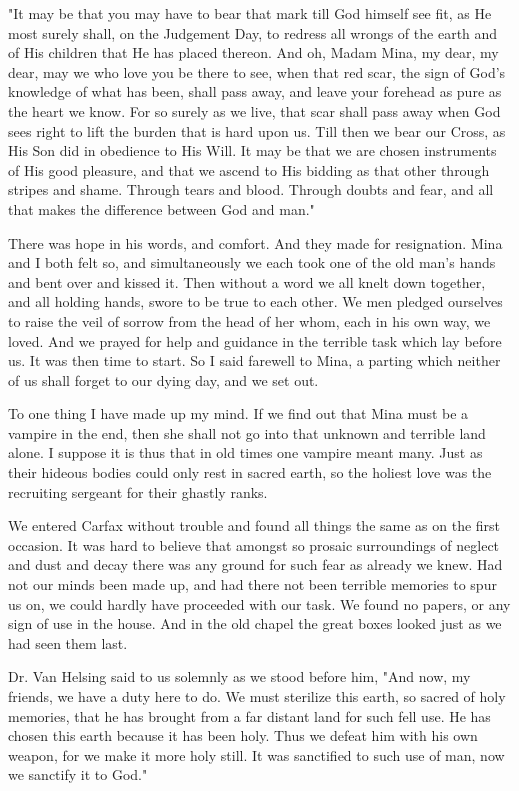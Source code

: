 "It may be that you may have to bear that mark till God himself see fit, as He most surely shall, on the Judgement Day, to redress all wrongs of the earth and of His children that He has placed thereon. And oh, Madam Mina, my dear, my dear, may we who love you be there to see, when that red scar, the sign of God's knowledge of what has been, shall pass away, and leave your forehead as pure as the heart we know. For so surely as we live, that scar shall pass away when God sees right to lift the burden that is hard upon us. Till then we bear our Cross, as His Son did in obedience to His Will. It may be that we are chosen instruments of His good pleasure, and that we ascend to His bidding as that other through stripes and shame. Through tears and blood. Through doubts and fear, and all that makes the difference between God and man." 

There was hope in his words, and comfort. And they made for resignation. Mina and I both felt so, and simultaneously we each took one of the old man's hands and bent over and kissed it. Then without a word we all knelt down together, and all holding hands, swore to be true to each other. We men pledged ourselves to raise the veil of sorrow from the head of her whom, each in his own way, we loved. And we prayed for help and guidance in the terrible task which lay before us. It was then time to start. So I said farewell to Mina, a parting which neither of us shall forget to our dying day, and we set out. 

To one thing I have made up my mind. If we find out that Mina must be a vampire in the end, then she shall not go into that unknown and terrible land alone. I suppose it is thus that in old times one vampire meant many. Just as their hideous bodies could only rest in sacred earth, so the holiest love was the recruiting sergeant for their ghastly ranks. 

We entered Carfax without trouble and found all things the same as on the first occasion. It was hard to believe that amongst so prosaic surroundings of neglect and dust and decay there was any ground for such fear as already we knew. Had not our minds been made up, and had there not been terrible memories to spur us on, we could hardly have proceeded with our task. We found no papers, or any sign of use in the house. And in the old chapel the great boxes looked just as we had seen them last. 

Dr. Van Helsing said to us solemnly as we stood before him, "And now, my friends, we have a duty here to do. We must sterilize this earth, so sacred of holy memories, that he has brought from a far distant land for such fell use. He has chosen this earth because it has been holy. Thus we defeat him with his own weapon, for we make it more holy still. It was sanctified to such use of man, now we sanctify it to God." 

